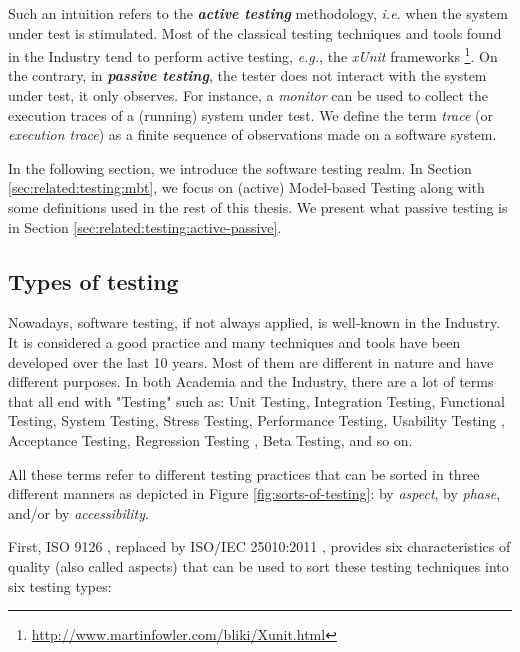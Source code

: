 Such an intuition refers to the \textbf{\emph{active testing}}
methodology, \emph{i.e.} when the system under test is
stimulated. Most of the classical testing techniques and tools
found in the Industry tend to perform active testing,
\emph{e.g.}, the \textit{xUnit} frameworks
\footnote{\url{http://www.martinfowler.com/bliki/Xunit.html}}.
On the contrary, in \textbf{\emph{passive testing}}, the tester
does not interact with the system under test, it only observes.
For instance, a \textit{monitor} can be used to collect the
execution traces of a (running) system under test. We define the
term \emph{trace} (or \emph{execution trace}) as a finite
sequence of observations made on a software system.

In the following section, we introduce the software testing
realm. In Section \ref{sec:related:testing:mbt}, we focus on
(active) Model-based Testing along with some definitions used in
the rest of this thesis. We present what passive testing is in
Section \ref{sec:related:testing:active-passive}.

\subsection{Types of testing}

Nowadays, software testing, if not always applied, is well-known
in the Industry. It is considered a good practice and many
techniques and tools have been developed over the last 10 years.
Most of them are different in nature and have different purposes.
In both Academia and the Industry, there are a lot of terms that
all end with "Testing" such as: Unit Testing, Integration
Testing, Functional Testing, System Testing, Stress Testing,
Performance Testing, Usability Testing
\cite{dumas1999practical,Theofanos:2003:BGA:947226.947227},
Acceptance Testing, Regression Testing
\cite{leung1989insights,wong1997study}, Beta Testing, and so on.

All these terms refer to different testing practices that can be
sorted in three different manners as depicted in Figure
\ref{fig:sorts-of-testing}: by \emph{aspect}, by \emph{phase},
and/or by \emph{accessibility}.

First, ISO 9126 \cite{iso9126}, replaced by ISO/IEC 25010:2011
\cite{10951538}, provides six characteristics of quality (also
called aspects) that can be used to sort these testing techniques
into six testing types:

